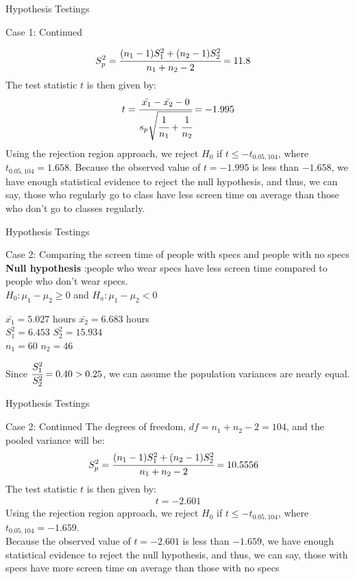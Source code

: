 \documentclass{beamer}
\begin{document}
\begin{frame}{Hypothesis Testings}
\begin{block}{Case 1: Continued}

 \begin{align}
     S_p^2 &= \cfrac{(n_1-1)S_1^2 + (n_2-1)S_2^2}{n_1+n_2-2} = 11.8
 \end{align}
The test statistic $t$ is then given by:
\begin{align}
      t &= \cfrac{\bar{x_1} - \bar{x_2} - 0}{s_p\sqrt{\cfrac{1}{n_1} + \cfrac{1}{n_2}}} = -1.995\\ \end{align}
 Using the rejection region approach, we reject $H_0$ if $t \leq -t_{0.05, 104}$, where $t_{0.05,104} =1.658$. 
 Because the observed value of $t=-1.995$ is less than $-1.658$, we have enough statistical evidence to reject the null hypothesis, and thus, we can say, those who regularly go to class have less screen time on average than those who don't go to classes regularly.
\end{block}
\end{frame}

\begin{frame}{Hypothesis Testings}
\begin{block}{Case 2: Comparing the screen time of people with specs and people with no specs}
\textbf{Null hypothesis} :people who wear specs have less screen time compared to people who don't wear specs.\\
  $ H_0 : \mu_1 - \mu_2 \geq 0$ and $H_a : \mu_1 - \mu_2 < 0$
\par
\begin{center}
    $\bar{x_1} = 5.027$ hours \quad $\bar{x_2} = 6.683$ hours \\
    $S^2_1 = 6.453$ \quad
    $S^2_2 = 15.934$ \\
    $n_1 = 60$ \quad
    $n_2 = 46$
\end{center}
Since $\cfrac{S_1^2}{S_2^2} = 0.40 > 0.25$, we can assume the population variances are nearly equal.
\end{block}
\end{frame}

\begin{frame}{Hypothesis Testings}
\begin{block}{Case 2: Continued}
The degrees of freedom, $df = n_1 + n_2 -2 = 104$, and the pooled variance will be:
 \begin{align}
     S_p^2 &= \cfrac{(n_1-1)S_1^2 + (n_2-1)S_2^2}{n_1+n_2-2} = 10.5556
 \end{align}
The test statistic $t$ is then given by:
\begin{align}
      t = -2.601
 \end{align}
Using the rejection region approach, we reject $H_0$ if $t \leq -t_{0.05, 104}$, where $t_{0.05,104} = -1.659$.\\ 
 Because the observed value of $t=-2.601$ is less than $-1.659$, we have enough statistical evidence to reject the null hypothesis, and thus, we can say, those with specs have more screen time on average than those with no specs
\end{block}
\end{frame}
\end{document}
